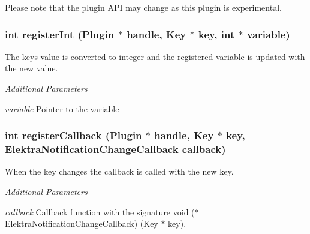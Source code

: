 Please note that the plugin A\+PI may change as this plugin is experimental.

\subsubsection*{int register\+Int (Plugin $\ast$ handle, Key $\ast$ key, int $\ast$ variable)}

The key\textquotesingle{}s value is converted to integer and the registered variable is updated with the new value.

{\itshape Additional Parameters}


\begin{DoxyItemize}
\item {\itshape variable} Pointer to the variable
\end{DoxyItemize}

\subsubsection*{int register\+Callback (Plugin $\ast$ handle, Key $\ast$ key, Elektra\+Notification\+Change\+Callback callback)}

When the key changes the callback is called with the new key.

{\itshape Additional Parameters}


\begin{DoxyItemize}
\item {\itshape callback} Callback function with the signature {\ttfamily void ($\ast$\+Elektra\+Notification\+Change\+Callback) (Key $\ast$ key)}. 
\end{DoxyItemize}